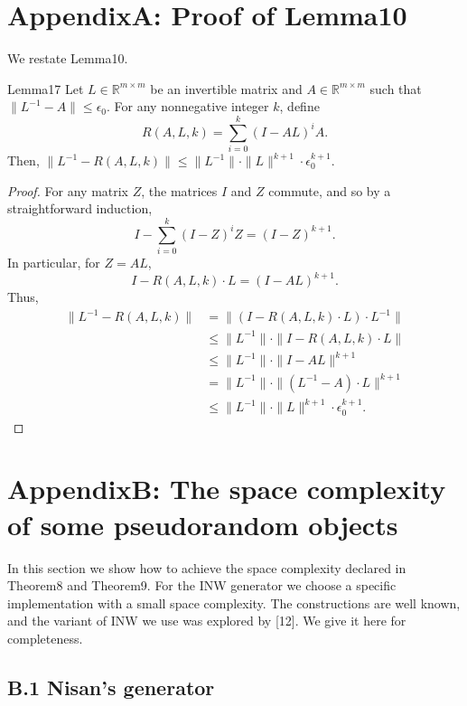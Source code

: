 \section*{AppendixA: Proof of Lemma10}
We restate Lemma10.
\begin{authorclaim}{Lemma17}
Let $L\in\mathbb R^{m\times m}$ be an invertible matrix and $A\in\mathbb R^{m\times m}$ such that $\|L^{-1}-A\|\le\epsilon_0$. For any nonnegative integer $k$, define
\[R(A,L,k)=\sum_{i=0}^k(I-AL)^iA.\]
Then, $\|L^{-1}-R(A,L,k)\|\le\|L^{-1}\|\cdot\|L\|^{k+1}\cdot\epsilon_0^{k+1}$.
\end{authorclaim}
\begin{proof}
For any matrix $Z$, the matrices $I$ and $Z$ commute, and so by a straightforward induction,
\[I-\sum_{i=0}^k(I-Z)^iZ=(I-Z)^{k+1}.\]
In particular, for $Z=AL$,
\[I-R(A,L,k)\cdot L=(I-AL)^{k+1}.\]
Thus,
\begin{align*}
\|L^{-1}-R(A,L,k)\|&=\|(I-R(A,L,k)\cdot L)\cdot L^{-1}\|\\
&\le\|L^{-1}\|\cdot\|I-R(A,L,k)\cdot L\|\\
&\le\|L^{-1}\|\cdot\|I-AL\|^{k+1}\\
&=\|L^{-1}\|\cdot\|(L^{-1}-A)\cdot L\|^{k+1}\\
&\le\|L^{-1}\|\cdot\|L\|^{k+1}\cdot\epsilon_0^{k+1}.
\end{align*}
\end{proof}
\section*{AppendixB: The space complexity of some pseudorandom objects}
In this section we show how to achieve the space complexity declared in Theorem8 and Theorem9. For the INW generator we choose a specific implementation with a small space complexity. The constructions are well known, and the variant of INW we use was explored by [12]. We give it here for completeness.
\subsection*{B.1 Nisan's generator}
